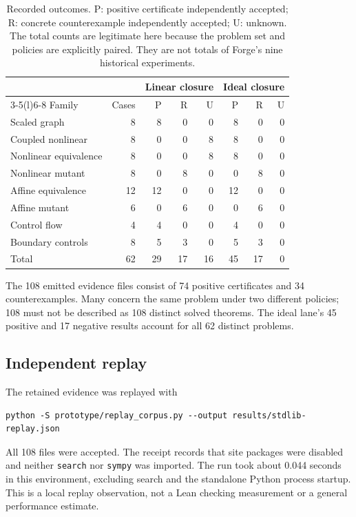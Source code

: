 \documentclass[11pt,letterpaper]{article}
\theoremstyle{definition}
\newcommand{\code}[1]{\nolinkurl{#1}}
\begin{document}
\begin{table}[ht]
\centering\small
\begin{tabular}{@{}lrrrrrrr@{}}
\toprule
& & \multicolumn{3}{c}{Linear closure} & \multicolumn{3}{c}{Ideal closure}\\
\cmidrule(lr){3-5}\cmidrule(l){6-8}
Family & Cases & P & R & U & P & R & U\\
\midrule
Scaled graph & 8 & 8&0&0 & 8&0&0\\
Coupled nonlinear & 8 & 0&0&8 & 8&0&0\\
Nonlinear equivalence & 8 & 0&0&8 & 8&0&0\\
Nonlinear mutant & 8 & 0&8&0 & 0&8&0\\
Affine equivalence & 12 & 12&0&0 & 12&0&0\\
Affine mutant & 6 & 0&6&0 & 0&6&0\\
Control flow & 4 & 4&0&0 & 4&0&0\\
Boundary controls & 8 & 5&3&0 & 5&3&0\\
\midrule
Total & 62 & 29&17&16 & 45&17&0\\
\bottomrule
\end{tabular}
\caption{Recorded outcomes. P: positive certificate independently accepted;
R: concrete counterexample independently accepted; U: unknown. The total counts
are legitimate here because the problem set and policies are explicitly paired.
They are not totals of Forge's nine historical experiments.}
\end{table}

The 108 emitted evidence files consist of 74 positive certificates and 34
counterexamples. Many concern the same problem under two different policies;
108 must not be described as 108 distinct solved theorems. The ideal lane's 45
positive and 17 negative results account for all 62 distinct problems.

\subsection{Independent replay}
The retained evidence was replayed with
\begin{lstlisting}
python -S prototype/replay_corpus.py --output results/stdlib-replay.json
\end{lstlisting}
All 108 files were accepted. The receipt records that site packages were
disabled and neither \code{search} nor \code{sympy} was imported. The run took
about 0.044 seconds in this environment, excluding search and the standalone
Python process startup. This is a local replay observation, not a Lean checking
measurement or a general performance estimate.
\end{document}
